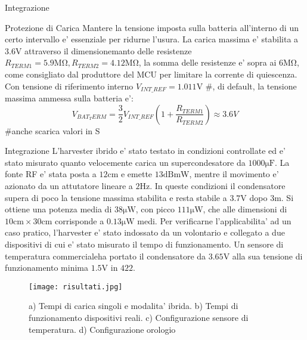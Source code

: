 \begin{section}{Integrazione}
    \begin{subsection}{Protezione di Carica}
        Mantere la tensione imposta sulla batteria all'interno di un certo intervallo e' essenziale per ridurne l'usura. La carica massima e' stabilita a \(3.6\mathrm{V}\) attraverso il dimensionemanto delle resistenze \(R_{TERM1}=5.9\mathrm{M\Omega},R_{TERM2}=4.12\mathrm{M\Omega}\), la somma delle resistenze e' sopra ai \(6\mathrm{M\Omega}\), come consigliato dal produttore del MCU per limitare la corrente di quiescenza. Con tensione di riferimento interno \(V_{INT\_REF}=1.011\mathrm{V}\) \#, di default, la tensione massima ammessa sulla batteria e': 
        \begin{equation*}
            V_{BAT_TERM} = \frac{3}{2}V_{INT\_REF}\left(1+\frac{R_{TERM1}}{R_{TERM2}}\right) \approx 3.6V
        \end{equation*}
        \#anche scarica valori in S
    \end{subsection}

    \begin{subsection}{Integrazione}
        L'harvester ibrido e' stato testato in condizioni controllate ed e' stato misurato quanto velocemente carica un supercondesatore da \(1000\mathrm{\mu F}\). La fonte RF e' stata posta a \(12\mathrm{cm}\) e emette \(13\mathrm{dBmW}\), mentre il movimento e' azionato da un attutatore lineare a \(2\mathrm{Hz}\). In queste condizioni il condensatore supera di poco la tensione massima stabilita e resta stabile a \(3.7\mathrm{V}\) dopo \(3\mathrm{m}\). Si ottiene una potenza media di \(38\mathrm{\mu W}\), con picco \(111\mathrm{\mu W}\), che alle dimensioni di \(10\mathrm{cm}\times30\mathrm{cm}\) corrisponde a \(0.13\mathrm{\mu W}\) medi. Per verificarne l'applicabilita' ad un caso pratico, l'harvester e' stato indossato da un volontario e collegato a due dispositivi di cui e' stato misurato il tempo di funzionamento. Un sensore di temperatura commercialeha portato il condensatore da \(3.65\mathrm{V}\) alla sua tensione di funzionamento minima \(1.5\mathrm{V}\) in \(42\mathrm{2}\).

        \begin{figure}
            \texttt{[image: risultati.jpg]}
            \centering
            \caption{a) Tempi di carica singoli e modalita' ibrida. b) Tempi di funzionamento dispositivi reali. c) Configurazione sensore di temperatura. d) Configurazione orologio}
        \end{figure}
        

\end{subsection}
\end{section}
